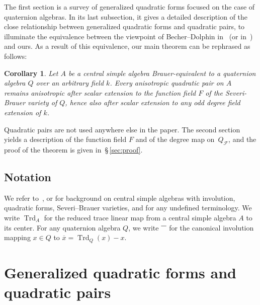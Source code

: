 \documentclass{amsart}
\newcommand{\invo}{\overline{\rule{2.5mm}{0mm}\rule{0mm}{4pt}}}
\newcommand{\calQ}{Q_\fq}
\newcommand{\FQ}{F}
\newcommand{\fq}{\mathcal{F}}
\DeclareMathOperator{\Trd}{Trd}
\newtheorem*{corol*}{Corollary}
\theoremstyle{remark}
\begin{document}
The first section is a survey of generalized quadratic forms focused
on the case of quaternion algebras. In its last subsection, it gives
a detailed description of the close
relationship between generalized quadratic forms and quadratic pairs,
to illuminate the equivalence between the viewpoint of Becher--Dolphin
in~\cite{BD} (or in~\cite{BoI}) and ours. As a result of this
equivalence, our main theorem can be rephrased as follows:

\begin{corol*} 
Let $A$ be a central simple algebra Brauer-equivalent to a quaternion algebra $Q$ over an arbitrary field $k$. Every anisotropic quadratic pair on $A$ remains anisotropic after scalar extension to the function field $F$ of the Severi-Brauer variety of $Q$, hence also after scalar extension to any odd degree field extension of $k$. 
\end{corol*}

Quadratic pairs are not used anywhere else in the paper.
The second section yields a description of
the function field $\FQ$ and of the degree map on~$\calQ$, and the
proof of the theorem is given in~\S\,\ref{sec:proof}.

\subsection*{Notation}
We refer to~\cite{EKM}, \cite{Knus} or \cite{BoI} for background on
central simple algebras with involution, quadratic forms,
Severi--Brauer varieties, and for any undefined terminology. 
We write
$\Trd_A$ for the reduced trace linear map from a central simple
algebra $A$ to its center. For any quaternion algebra $Q$, we write
$\invo$ for the canonical involution mapping $x\in Q$ to $\overline
x=\Trd_Q(x)-x$. 

\section{Generalized quadratic forms and quadratic pairs}
\label{sec:qf}
\end{document}
